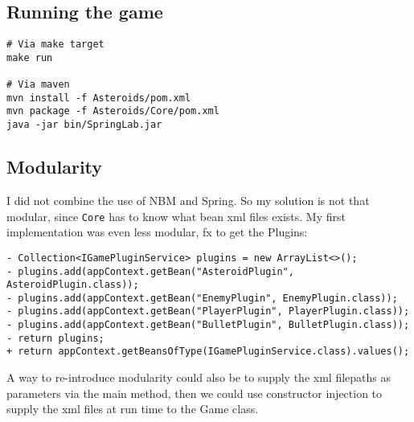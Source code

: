 \subsection{Running the game}
\begin{verbatim}
# Via make target
make run

# Via maven
mvn install -f Asteroids/pom.xml
mvn package -f Asteroids/Core/pom.xml
java -jar bin/SpringLab.jar
\end{verbatim}

\subsection{Modularity}
I did not combine the use of NBM and Spring. So my solution is
not that modular, since \texttt{Core} has to know what bean xml files exists.
My first implementation was even less modular, fx to get the Plugins:

\begin{verbatim}
- Collection<IGamePluginService> plugins = new ArrayList<>();
- plugins.add(appContext.getBean("AsteroidPlugin", AsteroidPlugin.class));
- plugins.add(appContext.getBean("EnemyPlugin", EnemyPlugin.class));
- plugins.add(appContext.getBean("PlayerPlugin", PlayerPlugin.class));
- plugins.add(appContext.getBean("BulletPlugin", BulletPlugin.class));
- return plugins;
+ return appContext.getBeansOfType(IGamePluginService.class).values();
\end{verbatim}

A way to re-introduce modularity could also be to supply the xml filepaths as 
parameters via the main method, then we could use constructor injection to supply
the xml files at run time to the Game class.
